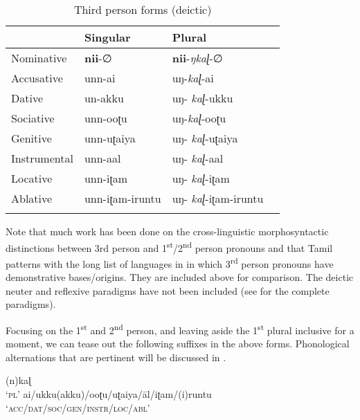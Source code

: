 \documentclass[output=paper]{langscibook}
\begin{document}
\begin{table}
    \begin{tabular}{llll}
    \lsptoprule
                 & Singular        & Plural              &  \\\midrule
    Nominative   & \textbf{nii}-∅           & \textbf{nii}-\textit{ŋkaɭ}-∅          &  \\
    Accusative   & unn-ai          & uŋ-\textit{kaɭ}-ai           &  \\
    Dative       & un-akku         & uŋ- \textit{kaɭ}-ukku        &  \\
    Sociative    & unn-ooʈu        & uŋ-\textit{kaɭ}-ooʈu         &  \\
    Genitive     & unn-uʈaiya      & uŋ- \textit{kaɭ}-uʈaiya      &  \\
    Instrumental & unn-aal         & uŋ- \textit{kaɭ}-aal         &  \\
    Locative     & unn-iʈam        & uŋ- \textit{kaɭ}-iʈam        &  \\
    Ablative     & unn-iʈam-iruntu & uŋ- \textit{kaɭ}-iʈam-iruntu & \\\lspbottomrule
    \end{tabular}
    \caption{Third person forms (deictic) \citep{steever2019dravidian}\label{new2c}}
\end{table}

Note that much work has been done on the cross-linguistic morphosyntactic distinctions between 3rd person and 1\textsuperscript{st}/2\textsuperscript{nd} person pronouns and that Tamil patterns with the long list of languages in \citet{harley2002person} in which 3\textsuperscript{rd} person pronouns have demonstrative bases/origins. They are included above for comparison. The deictic neuter and reflexive paradigms have not been included (see \citealt[110]{steever2019dravidian} for the complete paradigms). 

Focusing on the 1\textsuperscript{st} and 2\textsuperscript{nd} person, and leaving aside the 1\textsuperscript{st} plural inclusive for a moment, we can tease out the following suffixes in the above forms. Phonological alternations that are pertinent will be discussed in .

\begin{exe}
\ex \label{new3}
\begin{xlist}
\ex \label{new3a}
(n)kaɭ\\‘\textsc{pl}’
\ex \label{new3b} ai/ukku(akku)/ooʈu/uʈaiya/āl/iʈam/(i)runtu  \\
  \textsc{‘acc/dat/soc/gen/instr/loc/abl’}
\end{xlist}
\end{exe}
\end{document}
